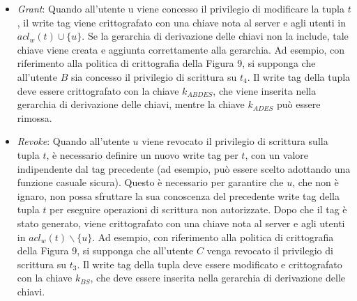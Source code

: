 \begin{itemize}
    \item \textit{Grant}: Quando all'utente u viene concesso il privilegio di modificare la tupla $t$, il write tag viene crittografato con una chiave nota al server e agli utenti in $acl_w(t)\cup\{u\}$. Se la gerarchia di derivazione delle chiavi non la include, tale chiave viene creata e aggiunta correttamente alla gerarchia. Ad esempio, con riferimento alla politica di crittografia della Figura 9, si supponga che all'utente $B$ sia concesso il privilegio di scrittura su $t_4$. Il write tag della tupla deve essere crittografato con la chiave $k_{ABDES}$, che viene inserita nella gerarchia di derivazione delle chiavi, mentre la chiave $k_{ADES}$ può essere rimossa.
    \item \textit{Revoke}: Quando all'utente $u$ viene revocato il privilegio di scrittura sulla tupla $t$, è necessario definire un nuovo write tag per $t$, con un valore indipendente dal tag precedente (ad esempio, può essere scelto adottando una funzione casuale sicura). Questo è necessario per garantire che $u$, che non è ignaro, non possa sfruttare la sua conoscenza del precedente write tag della tupla $t$ per eseguire operazioni di scrittura non autorizzate. Dopo che il tag è stato generato, viene crittografato con una chiave nota al server e agli utenti in $acl_w(t)\backslash\{u\}$. Ad esempio, con riferimento alla politica di crittografia della Figura 9, si supponga che all'utente $C$ venga revocato il privilegio di scrittura su $t_3$. Il write tag della tupla deve essere modificato e crittografato con la chiave $k_{BS}$, che deve essere inserita nella gerarchia di derivazione delle chiavi.
\end{itemize}




